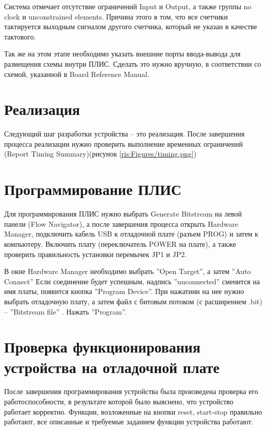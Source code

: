 \begin{sloppypar}
\newpage
Система отмечает отсутствие ограничений Input и Output, а также группы no clock и unconstrained elements. Причина этого в том, что все счетчики тактируется выходным сигналом другого счетчика, который не указан в качестве тактового.

Так же на этом этапе необходимо указать внешние порты ввода-вывода для размещения схемы внутри ПЛИС. Сделать это нужно вручную, в соответствии со схемой, указанной в Board Reference Manual.




\section{Реализация} %
Следующий шаг разработки устройства – это реализация.
После завершения процесса реализации нужно проверить выполнение временных ограничений (Report Timing Summary)(рисунок \ref{ris:Figures/timing.png})
\section{Программирование ПЛИС} %

Для программирования ПЛИС нужно выбрать Generate Bitstream на левой панели (Flow Navigator), а после завершения процесса открыть Hardware Manager, подключить кабель USB к отладочной плате (разъем PROG) и затем к компьютеру. Включить плату (переключатель POWER на плате), а также проверить правильность установки перемычек JP1 и JP2. 

В окне Hardware Manager необходимо выбрать ''Open Target'', а затем ''Auto Connect'' Если соединение будет успешным, надпись ''unconnected'' сменится на имя платы, появится кнопка ''Program Device''. При нажатиии на нее нужно выбрать отладочную плату, а затем файл с битовым потоком (с расширением
.bit) -- ''Bitstream file'' . Нажать ''Program''.

\section{Проверка функционирования устройства на отладочной плате} %
После завершения программирования устройства была произведена проверка его работоспособности, в результате которой было выяснено, что устройство работает корректно. Функции, возложенные на кнопки reset, start-stop правильно работают, все описанные и требуемые заданием функции устройства работают.

\end{sloppypar}

